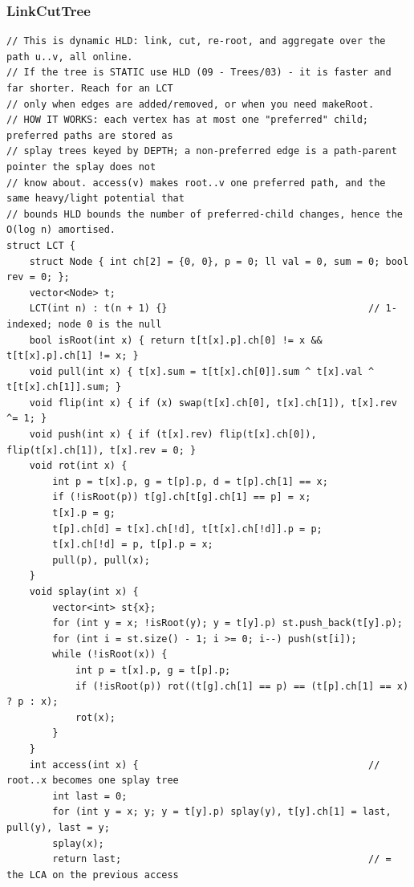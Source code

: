 \documentclass[9pt,a4paper,twocolumn]{extarticle}
\begin{document}
\subsubsection{LinkCutTree}
\nopagebreak
\begin{lstlisting}
// This is dynamic HLD: link, cut, re-root, and aggregate over the path u..v, all online.
// If the tree is STATIC use HLD (09 - Trees/03) - it is faster and far shorter. Reach for an LCT
// only when edges are added/removed, or when you need makeRoot.
// HOW IT WORKS: each vertex has at most one "preferred" child; preferred paths are stored as
// splay trees keyed by DEPTH; a non-preferred edge is a path-parent pointer the splay does not
// know about. access(v) makes root..v one preferred path, and the same heavy/light potential that
// bounds HLD bounds the number of preferred-child changes, hence the O(log n) amortised.
struct LCT {
    struct Node { int ch[2] = {0, 0}, p = 0; ll val = 0, sum = 0; bool rev = 0; };
    vector<Node> t;
    LCT(int n) : t(n + 1) {}                                   // 1-indexed; node 0 is the null
    bool isRoot(int x) { return t[t[x].p].ch[0] != x && t[t[x].p].ch[1] != x; }
    void pull(int x) { t[x].sum = t[t[x].ch[0]].sum ^ t[x].val ^ t[t[x].ch[1]].sum; }
    void flip(int x) { if (x) swap(t[x].ch[0], t[x].ch[1]), t[x].rev ^= 1; }
    void push(int x) { if (t[x].rev) flip(t[x].ch[0]), flip(t[x].ch[1]), t[x].rev = 0; }
    void rot(int x) {
        int p = t[x].p, g = t[p].p, d = t[p].ch[1] == x;
        if (!isRoot(p)) t[g].ch[t[g].ch[1] == p] = x;
        t[x].p = g;
        t[p].ch[d] = t[x].ch[!d], t[t[x].ch[!d]].p = p;
        t[x].ch[!d] = p, t[p].p = x;
        pull(p), pull(x);
    }
    void splay(int x) {
        vector<int> st{x};
        for (int y = x; !isRoot(y); y = t[y].p) st.push_back(t[y].p);
        for (int i = st.size() - 1; i >= 0; i--) push(st[i]);
        while (!isRoot(x)) {
            int p = t[x].p, g = t[p].p;
            if (!isRoot(p)) rot((t[g].ch[1] == p) == (t[p].ch[1] == x) ? p : x);
            rot(x);
        }
    }
    int access(int x) {                                        // root..x becomes one splay tree
        int last = 0;
        for (int y = x; y; y = t[y].p) splay(y), t[y].ch[1] = last, pull(y), last = y;
        splay(x);
        return last;                                           // = the LCA on the previous access

\end{lstlisting}
\end{document}
